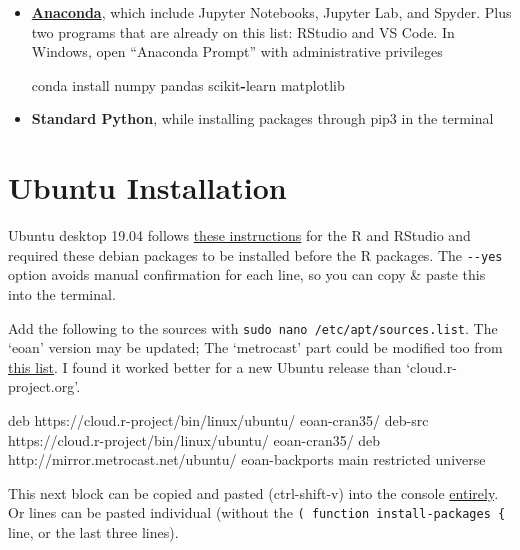 \documentclass[
]{book}
\newenvironment{Shaded}{\begin{snugshade}}{\end{snugshade}}
\newcommand{\ExtensionTok}[1]{#1}
\newcommand{\NormalTok}[1]{#1}
\newcommand{\OperatorTok}[1]{\textcolor[rgb]{0.81,0.36,0.00}{\textbf{#1}}}
\begin{document}
\begin{itemize}
  \begin{itemize}
  \item
    \textbf{\href{https://www.anaconda.com/distribution/\#download-section}{Anaconda}}, which include Jupyter Notebooks, Jupyter Lab, and Spyder. Plus two programs that are already on this list: RStudio and VS Code. In Windows, open ``Anaconda Prompt'' with administrative privileges

\begin{Shaded}
\begin{Highlighting}[]
\NormalTok{conda install numpy pandas scikit}\OperatorTok{{-}}\NormalTok{learn matplotlib}
\end{Highlighting}
\end{Shaded}
  \item
    \textbf{Standard Python}, while installing packages through pip3 in the terminal
  \end{itemize}
\end{itemize}

\hypertarget{installation-ubuntu}{%
\section{Ubuntu Installation}\label{installation-ubuntu}}

Ubuntu desktop 19.04 follows \href{https://askubuntu.com/a/862520/153921}{these instructions} for the R and RStudio and required these debian packages to be installed before the R packages. The \texttt{-\/-yes} option avoids manual confirmation for each line, so you can copy \& paste this into the terminal.

Add the following to the sources with \texttt{sudo\ nano\ /etc/apt/sources.list}. The `eoan' version may be updated; The `metrocast' part could be modified too from \href{https://launchpad.net/ubuntu/+archivemirrors}{this list}. I found it worked better for a new Ubuntu release than `cloud.r-project.org'.

\begin{Shaded}
\begin{Highlighting}[]
\ExtensionTok{deb}\NormalTok{ https://cloud.r{-}project/bin/linux/ubuntu/ eoan{-}cran35/}
\ExtensionTok{deb{-}src}\NormalTok{ https://cloud.r{-}project/bin/linux/ubuntu/ eoan{-}cran35/}
\ExtensionTok{deb}\NormalTok{ http://mirror.metrocast.net/ubuntu/ eoan{-}backports main restricted universe}
\end{Highlighting}
\end{Shaded}

This next block can be copied and pasted (ctrl-shift-v) into the console \href{https://stackoverflow.com/a/43164204}{entirely}. Or lines can be pasted individual (without the \texttt{(\ function\ install-packages\ \{} line, or the last three lines).
\end{document}
